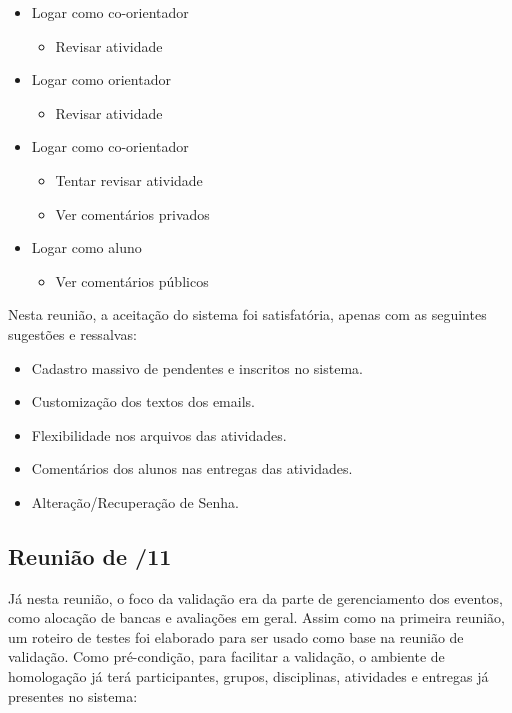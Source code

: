 \begin{itemize}
    \item Logar como co-orientador
    \begin{itemize}
        \item Revisar atividade
    \end{itemize}

    \item Logar como orientador
    \begin{itemize}
        \item Revisar atividade
    \end{itemize}

    \item Logar como co-orientador
    \begin{itemize}
        \item Tentar revisar atividade
        \item Ver comentários privados
    \end{itemize}
    
    \item Logar como aluno
    \begin{itemize}
        \item Ver comentários públicos
    \end{itemize}
\end{itemize}

Nesta reunião, a aceitação do sistema foi satisfatória, apenas com as seguintes sugestões e ressalvas:

\begin{itemize}
    \item Cadastro massivo de pendentes e inscritos no sistema.
    \item Customização dos textos dos emails.
    \item Flexibilidade nos arquivos das atividades.
    \item Comentários dos alunos nas entregas das atividades.
    \item Alteração/Recuperação de Senha.
\end{itemize}

\subsection{Reunião de /11}

Já nesta reunião, o foco da validação era da parte de gerenciamento dos eventos, como alocação de bancas e avaliações em geral. Assim como na primeira reunião, um roteiro de testes foi elaborado para ser usado como base na reunião de validação. Como pré-condição, para facilitar a validação, o ambiente de homologação já terá participantes, grupos, disciplinas, atividades e entregas já presentes no sistema:

